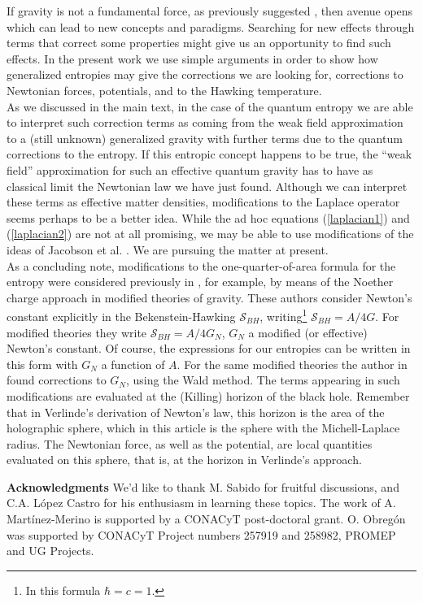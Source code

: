 \documentclass[nofootinbib,aps,prd,preprint,groupedaddress,showpacs,showkeys]{revtex4-1}
\begin{document}
\noindent If gravity is not a fundamental force, as previously suggested \cite{Jacobson1, Jacobson2, Verlinde}, then avenue opens which can lead to new concepts and paradigms. Searching for new effects through terms that correct some properties might give us an opportunity to find such effects. In the present work we use simple arguments in order to show how generalized entropies may give the corrections we are looking for, corrections to Newtonian forces,  potentials, and to the Hawking temperature.\\
\indent As we discussed in the main text, in the case of the quantum entropy we are able to interpret such correction terms as coming from the weak field approximation to a (still unknown) generalized gravity with further terms due to the quantum corrections to the entropy. If this entropic concept happens to be true, the ``weak field'' approximation for such an effective quantum gravity has to have as classical limit the Newtonian law we have just found. Although we can interpret these terms as effective matter densities, modifications to the Laplace operator seems perhaps to be a better idea. While the ad hoc equations (\ref{laplacian1}) and (\ref{laplacian2}) are not at all promising, we may be able to use modifications of the ideas of Jacobson et al. \cite{Jacobson3, Jacobson4}. We are pursuing the matter at present.\\
\indent As a concluding note, modifications to the one-quarter-of-area formula for the entropy were considered previously in \cite{Visser, JKM}, for example, by means of the Noether charge approach \cite{Wald} in modified theories of gravity. These authors consider Newton's constant explicitly in the Bekenstein-Hawking $\mathcal{S}_{BH}$, writing\footnote{In this formula $\hbar = c = 1$.} $\mathcal{S}_{BH} = A/4G$.  For modified theories they write $\mathcal{S}_{BH} = A/4G_N$, $G_N$ a modified (or effective) Newton's constant. Of course, the expressions for our entropies can be written in this form with $G_N$ a function of $A$.  For the same modified theories the author in \cite{Vollik} found corrections to $G_N$, using the Wald method. The terms appearing in such modifications are evaluated at the (Killing) horizon of the black hole. Remember that in Verlinde's derivation of Newton's law, this horizon is the area of the holographic sphere, which in this article is the sphere with the Michell-Laplace radius. The Newtonian force, as well as the potential, are local quantities evaluated on this sphere, that is, at the horizon in Verlinde's approach.

{\bf Acknowledgments} We'd like to thank M. Sabido for fruitful discussions, and C.A. L\'opez Castro for his enthusiasm in learning these topics. The work of A. Mart\'inez-Merino is supported by a CONACyT post-doctoral grant. O. Obreg\'on was supported by CONACyT Project numbers 257919 and 258982, PROMEP and UG Projects.



\end{document}

